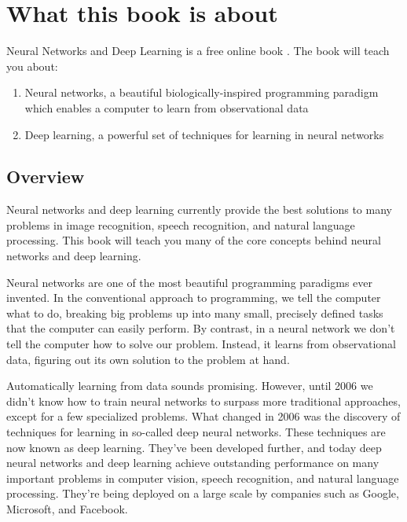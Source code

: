 
\chapter*{What this book is about}


Neural Networks and Deep Learning is a free online book \cite{Nielsen2015}. The book will teach you about: 
\begin{enumerate}
\item  Neural networks, a beautiful biologically-inspired programming paradigm which enables a computer to learn from observational data 

\item Deep learning, a powerful set of techniques for learning in neural networks 
\end{enumerate}

\section*{Overview}

Neural networks and deep learning currently provide the best solutions to many problems in image recognition, speech recognition, and natural language processing. This book will teach you many of the core concepts behind neural networks and deep learning. 

Neural networks are one of the most beautiful programming paradigms ever invented. In the conventional approach to programming, we tell the computer what to do, breaking big problems up into many small, precisely defined tasks that the computer can easily perform. By contrast, in a neural network we don't tell the computer how to solve our problem. Instead, it learns from observational data, figuring out its own solution to the problem at hand.

Automatically learning from data sounds promising. However, until 2006 we didn't know how to train neural networks to surpass more traditional approaches, except for a few specialized problems. What changed in 2006 was the discovery of techniques for learning in so-called deep neural networks. These techniques are now known as deep learning. They've been developed further, and today deep neural networks and deep learning achieve outstanding performance on many important problems in computer vision, speech recognition, and natural language processing. They're being deployed on a large scale by companies such as Google, Microsoft, and Facebook.

